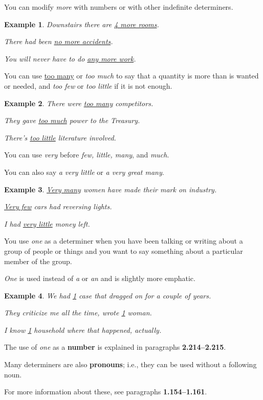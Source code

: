 \documentclass[oneside]{book}
\numberwithin{equation}{section}
\newtheorem{example}{Example}[section]
\begin{document}
%
You can modify \textit{more} with numbers or with other indefinite determiners.
\begin{example}
    Downstairs there are \underline{4 more rooms}.
    
    There had been \underline{no more accidents}.
    
    You will never have to do \underline{any more work}.
\end{example}
You can use \underline{too many} or \textit{too much} to say that a quantity is more than is wanted or needed, and \textit{too few} or \textit{too little} if it is not enough.
\begin{example}
    There were \underline{too many} competitors.
    
    They gave \underline{too much} power to the Treasury.
    
    There's \underline{too little} literature involved.
\end{example}
You can use \textit{very} before \textit{few, little, many}, and \textit{much}.

You can also say \textit{a very little} or \textit{a very great many}.
\begin{example}
    \underline{Very many} women have made their mark on industry.
    
    \underline{Very few} cars had reversing lights.
    
    I had \underline{very little} money left.
\end{example}
%
\noindent{} You use \textit{one} as a determiner when you have been talking or writing about a group of people or things and you want to say something about a particular member of the group.

\textit{One} is used instead of \textit{a} or \textit{an} and is slightly more emphatic.
\begin{example}
    We had \underline{1} case that dragged on for a couple of years.
    
    They criticize me all the time, wrote \underline{1} woman.
    
    I know \underline{1} household where that happened, actually.
\end{example} 
The use of \textit{one} as a \textbf{number} is explained in paragraphs \textbf{2.214--2.215}.

%
\noindent{} Many determiners are also \textbf{pronouns}; i.e., they can be used without a following noun.

For more information about these, see paragraphs \textbf{1.154--1.161}.
\end{document}
